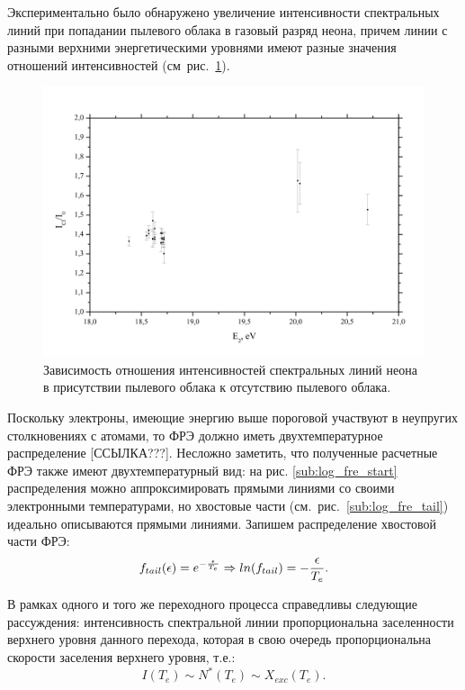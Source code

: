 Экспериментально было обнаружено увеличение интенсивности спектральных линий при попадании пылевого облака
в газовый разряд неона, причем линии с разными верхними энергетическими уровнями имеют разные значения
отношений интенсивностей (см~рис.~\ref{fig:fig35}).
\begin{figure}[t]
    \centering
    \includegraphics[width=16cm]{figures/fig35}
    \caption{Зависимость отношения интенсивностей спектральных линий неона в присутствии пылевого облака к отсутствию пылевого облака.}
    \label{fig:fig35}
\end{figure}



Поскольку электроны, имеющие энергию выше пороговой участвуют в неупругих столкновениях с атомами, то ФРЭ должно иметь
двухтемпературное распределение [ССЫЛКА???]. Несложно заметить, что полученные расчетные ФРЭ также имеют двухтемпературный вид:
на рис. {\ref{sub:log_fre_start}} распределения можно аппроксимировать прямыми линиями со своими электронными
температурами, но хвостовые части (см.~рис.~\ref{sub:log_fre_tail}) идеально описываются прямыми линиями. Запишем распределение хвостовой части ФРЭ:
\begin{equation}
    f_{tail}(\epsilon) = e^{-{\epsilon \over T_e}} \Rightarrow ln(f_{tail}) = - {\epsilon \over T_e}.
    \label{eq:tail}
\end{equation}

В рамках одного и того же переходного процесса справедливы следующие рассуждения: интенсивность
спектральной линии пропорциональна заселенности верхнего уровня данного перехода, которая в свою очередь
пропорциональна скорости заселения верхнего уровня, т.е.:
\begin{equation}
I(T_e) \sim N^*(T_e) \sim X_{exc}(T_e).  %
\label{eq:sim_Te}
\end{equation}

